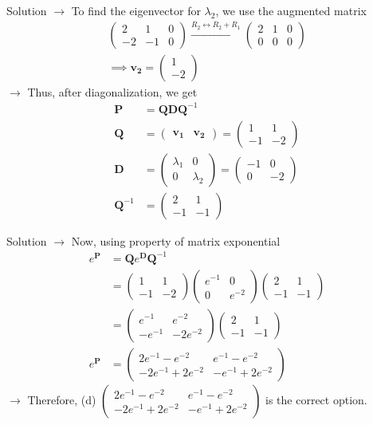 \documentclass{beamer}
\numberwithin{equation}{section}
\theoremstyle{remark}
\newcommand{\myvec}[1]{\ensuremath{\begin{pmatrix}#1\end{pmatrix}}}
\let\vec\mathbf
\begin{document}
\begin{frame}{Solution}
$\rightarrow$ To find the eigenvector for $\lambda_2$, we use the augmented matrix
\begin{align}
    \left(\begin{array}{cc|c}2&1&0\\-2&-1&0\end{array}\right) \xrightarrow{R_2 \leftrightarrow R_2 + R_1} \left(\begin{array}{cc|c}2&1&0\\0&0&0\end{array}\right) \\
    \implies \vec{v_2} = \myvec{1\\-2}
\end{align}
$\rightarrow$ Thus, after diagonalization, we get
\begin{align}
    \vec{P} &= \vec{Q}\vec{D}\vec{Q}^{-1} \\
    \vec{Q} &= \myvec{\vec{v_1}&\vec{v_2}} = \myvec{1&1\\-1&-2} \\
    \vec{D} &= \myvec{\lambda_1&0\\0&\lambda_2} = \myvec{-1&0\\0&-2} \\
    \vec{Q}^{-1} &= \myvec{2&1\\-1&-1}
\end{align}
\end{frame}

\begin{frame}{Solution}
$\rightarrow$ Now, using property of matrix exponential
\begin{align}
    e^{\vec{P}} &= \vec{Q}e^{\vec{D}}\vec{Q}^{-1} \\
    &= \myvec{1&1\\-1&-2}\myvec{e^{-1}&0\\0&e^{-2}}\myvec{2&1\\-1&-1} \\
    &= \myvec{e^{-1}&e^{-2}\\-e^{-1}&-2e^{-2}}\myvec{2&1\\-1&-1} \\
    e^{\vec{P}} &= \myvec{2e^{-1}-e^{-2}&e^{-1}-e^{-2}\\-2e^{-1}+2e^{-2}&-e^{-1}+2e^{-2}}
\end{align}
$\rightarrow$ Therefore, (d) $\myvec{2e^{-1}-e^{-2}&e^{-1}-e^{-2}\\-2e^{-1}+2e^{-2}&-e^{-1}+2e^{-2}}$ is the correct option.
\end{frame}
\end{document}
